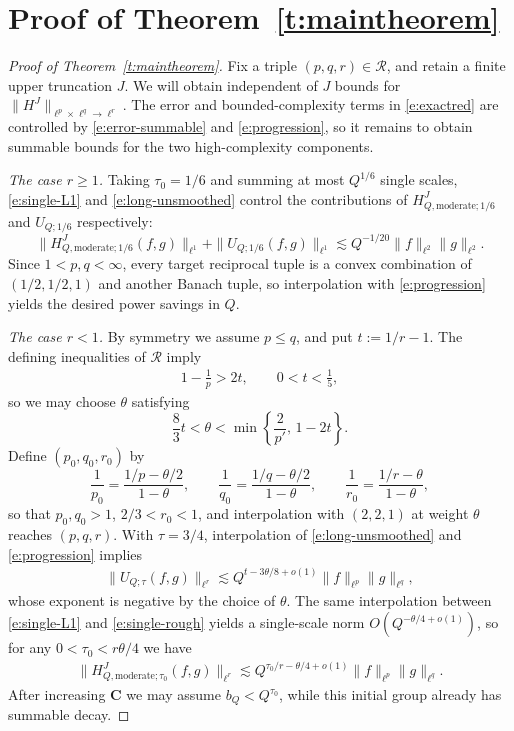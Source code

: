\documentclass[12pt,leqno]{amsart}
\numberwithin{equation}{section}
\theoremstyle{definition}
\theoremstyle{plain}
\begin{document}
	\section{Proof of Theorem~\ref{t:maintheorem}}\label{s:final}
	\begin{proof}[Proof of Theorem~\ref{t:maintheorem}]
		Fix a triple $(p,q,r)\in\mathcal R$, and retain a finite upper truncation $J$. We will obtain independent of $J$  bounds for   $ \| H^J \|_{\ell^p \times \ell^q \to \ell^r}.$ 
		The error and bounded-complexity terms in \eqref{e:exactred} are
		controlled by \eqref{e:error-summable} and \eqref{e:progression}, so it
		remains to obtain summable bounds for the two high-complexity components.
		
		\emph{The case $r\geq1$.}
		Taking $\tau_0=1/6$ and summing at most $Q^{1/6}$ single scales,
		\eqref{e:single-L1} and \eqref{e:long-unsmoothed}  control the contributions of $H^J_{Q,\mathrm{moderate};1/6}$ and $U_{Q;1/6}$ respectively:
		\[
		\|H^J_{Q,\mathrm{moderate};1/6}(f,g)\|_{\ell^1}
		+\|U_{Q;1/6}(f,g)\|_{\ell^1}
		\lesssim Q^{-1/20}\|f\|_{\ell^2}\|g\|_{\ell^2}.
		\]
		Since $1<p,q<\infty$, every target reciprocal tuple is a convex
		combination of $(1/2,1/2,1)$ and another Banach tuple, so interpolation with \eqref{e:progression} yields the desired power savings in $Q$.
	
		
		\emph{The case $r<1$.}
		By symmetry we assume $p\leq q$, and put $t:=1/r-1$.
		The defining inequalities of $\mathcal R$ imply
		\begin{align}\label{e:range-gaps}
			1-\frac1p>2t,\qquad 0<t<\frac15,
		\end{align}
		so we may choose $\theta$ satisfying
		\[
		\frac83t<\theta<\min\left\{\frac{2}{p'},\,1-2t\right\}.
		\]
		Define $(p_0,q_0,r_0)$ by
		\[
		\frac1{p_0}=\frac{1/p-\theta/2}{1-\theta},\qquad
		\frac1{q_0}=\frac{1/q-\theta/2}{1-\theta},\qquad
		\frac1{r_0}=\frac{1/r-\theta}{1-\theta},
		\]
		so that $p_0,q_0>1$, $2/3<r_0<1$, and interpolation with
		$(2,2,1)$ at weight $\theta$ reaches $(p,q,r)$.
		With $\tau=3/4$, interpolation of \eqref{e:long-unsmoothed} and
		\eqref{e:progression} implies
		\begin{align}\label{eq:singlecomplexitylongquasibanach}
			\|U_{Q;\tau}(f,g)\|_{\ell^r}
			\lesssim Q^{t-3\theta/8+o(1)}\|f\|_{\ell^p}\|g\|_{\ell^q},
		\end{align}
		whose exponent is negative by the choice of $\theta$.
		The same interpolation between \eqref{e:single-L1} and
		\eqref{e:single-rough} yields a single-scale norm
		$O(Q^{-\theta/4+o(1)})$, so for any $0<\tau_0<r\theta/4$ we have
		\begin{align}\label{e:negpower}
			\|H^J_{Q,\mathrm{moderate};\tau_0}(f,g)\|_{\ell^r}
			\lesssim Q^{\tau_0/r-\theta/4+o(1)}
			\|f\|_{\ell^p}\|g\|_{\ell^q}.
		\end{align}
		After increasing $\mathbf C$ we may assume $b_Q<Q^{\tau_0}$,
		while this initial group already has summable decay.
		

\end{proof}
\end{document}
